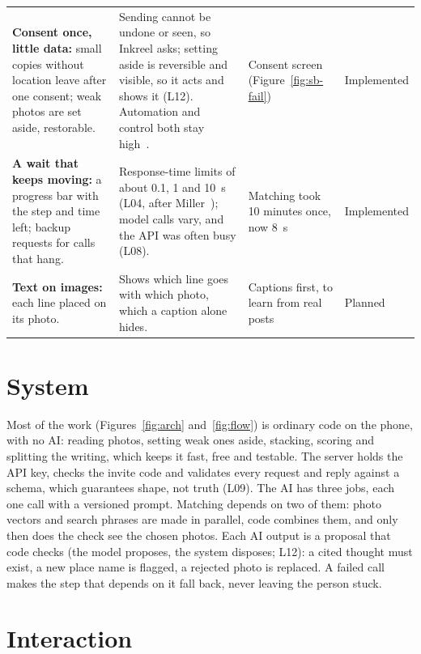 \documentclass[11pt,a4paper]{article}
\begin{document}
{\begin{xltabular}{\textwidth}{@{}L{3.4cm}YL{2.95cm}L{1.75cm}@{}}
\textbf{Consent once, little data:} small copies without location leave after one consent;
weak photos are set aside, restorable.
& Sending cannot be undone or seen, so Inkreel asks; setting aside is reversible and visible, so it
acts and shows it (L12). Automation and control both stay
high~\cite{shneiderman_human-centered_2022}.
& Consent screen (Figure~\ref{fig:sb-fail})
& Implemented\\
\textbf{A wait that keeps moving:} a progress bar with the step and time left; backup requests
for calls that hang.
& Response-time limits of about 0.1, 1 and 10~s (L04, after Miller~\cite{miller_response_1968}); model calls
vary, and the API was often busy (L08).
& Matching took 10 minutes once, now 8~s
& Implemented\\
\textbf{Text on images:} each line placed on its photo.
& Shows which line goes with which photo, which a caption alone hides.
& Captions first, to learn from real posts
& Planned\\
\bottomrule
\end{xltabular}}


\section{System}

Most of the work (Figures~\ref{fig:arch} and~\ref{fig:flow}) is ordinary code on the phone, with no
AI: reading photos, setting weak ones aside,
stacking, scoring and splitting the writing, which keeps it fast, free and testable. The server
holds the API key, checks the invite code and validates every request and reply against a schema,
which guarantees shape, not truth (L09). The AI has three jobs, each one call with a versioned
prompt. Matching depends on two of them: photo vectors and search phrases are made in parallel,
code combines them, and only then does the check see the chosen photos. Each AI output is a
proposal that code checks (the model proposes, the system disposes; L12): a cited thought must
exist, a new place name is flagged, a rejected photo is replaced. A failed call makes the step
that depends on it fall back, never leaving the person stuck.




\section{Interaction}
\end{document}
